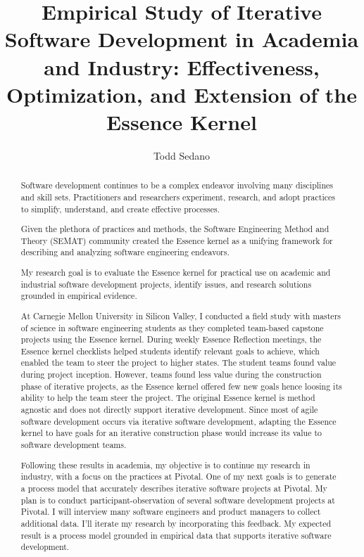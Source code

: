 \documentclass[preprint,12pt,3p]{elsarticle}
\begin{document}
\begin{frontmatter}

\title{Empirical Study of Iterative Software Development in Academia and Industry: Effectiveness, Optimization, and Extension of the Essence Kernel}

\author{Todd Sedano}


\address{Carnegie Mellon University}
\address{Silicon Valley Campus}
\address{Moffett Field, CA 94035, USA}


\begin{abstract}
Software development continues to be a complex endeavor involving many disciplines and skill sets. Practitioners and researchers experiment, research, and adopt practices to simplify, understand, and create effective processes. 

Given the plethora of practices and methods, the Software Engineering Method and Theory (SEMAT) community created the Essence kernel as a unifying framework for describing and analyzing software engineering endeavors. 

My research goal is to evaluate the Essence kernel for practical use on academic and industrial software development projects, identify issues, and research solutions grounded in empirical evidence. 

At Carnegie Mellon University in Silicon Valley, I conducted a field study with masters of science in software engineering students as they completed team-based capstone projects using the Essence kernel. During weekly Essence Reflection meetings, the Essence kernel checklists helped students identify relevant goals to achieve, which enabled the team to steer the project to higher states. The student teams found value during project inception. However, teams found less value during the construction phase of iterative projects, as the Essence kernel offered few new goals hence loosing its ability to help the team steer the project. The original Essence kernel is method agnostic and does not directly support iterative development. Since most of agile software development occurs via iterative software development, adapting the Essence kernel to have goals for an iterative construction phase would increase its value to software development teams.

Following these results in academia, my objective is to continue my research in industry, with a focus on the practices at Pivotal. One of my next goals is to generate a process model that accurately describes iterative software projects at Pivotal. My plan is to conduct participant-observation of several software development projects at Pivotal. I will interview many software engineers and product managers to collect additional data. I'll iterate my research by incorporating this feedback. My expected result is a process model grounded in empirical data that supports iterative software development. 


\end{abstract}
\end{frontmatter}
\end{document}
